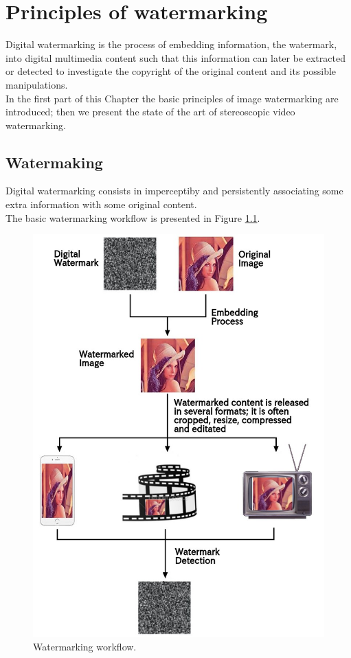 \chapter{Principles of watermarking}
\label{wat}

Digital watermarking is the process of embedding information, the watermark, into digital multimedia content such that this information can later be extracted or detected to investigate the copyright of the original content
and its possible manipulations.\\
In the first part of this Chapter the basic principles of image watermarking are introduced; then we present the state of the art of stereoscopic video watermarking.


\section{Watermaking}

Digital watermarking consists in imperceptiby and persistently associating some extra information with some original content. \\
The basic watermarking workflow is presented in Figure \ref{fig:workflow}.\\
\begin{figure}[h!]
\centering
\includegraphics[width=1\textwidth]{./img/wat_workflow.jpg}
\caption{\small{Watermarking workflow.}}
\label{fig:workflow}
\end{figure}
\clearpage
